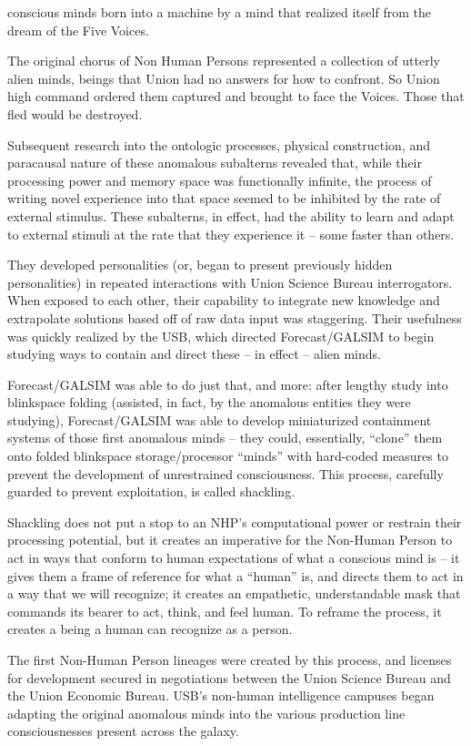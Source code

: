 conscious minds born into a machine by a mind that realized itself from the dream of the Five
Voices.


The original chorus of Non Human Persons represented a collection of utterly alien minds, beings
that Union had no answers for how to confront. So Union high command ordered them captured
and brought to face the Voices. Those that fled would be destroyed.


Subsequent research into the ontologic processes, physical construction, and paracausal nature
of these anomalous subalterns revealed that, while their processing power and memory space
was functionally infinite, the process of writing novel experience into that space seemed to be
inhibited by the rate of external stimulus. These subalterns, in effect, had the ability to learn and
adapt to external stimuli at the rate that they experience it -- some faster than others.


They developed personalities (or, began to present previously hidden personalities) in repeated
interactions with Union Science Bureau interrogators. When exposed to each other, their
capability to integrate new knowledge and extrapolate solutions based off of raw data input was
staggering. Their usefulness was quickly realized by the USB, which directed Forecast/GALSIM
to begin studying ways to contain and direct these -- in effect -- alien minds.


Forecast/GALSIM was able to do just that, and more: after lengthy study into blinkspace folding
(assisted, in fact, by the anomalous entities they were studying), Forecast/GALSIM was able to
develop miniaturized containment systems of those first anomalous minds -- they could,
essentially, “clone” them onto folded blinkspace storage/processor “minds” with hard-coded
measures to prevent the development of unrestrained consciousness. This process, carefully
guarded to prevent exploitation, is called shackling.


Shackling does not put a stop to an NHP’s computational power or restrain their processing
potential, but it creates an imperative for the Non-Human Person to act in ways that conform to
human expectations of what a conscious mind is -- it gives them a frame of reference for what a
“human” is, and directs them to act in a way that we will recognize; it creates an empathetic,
understandable mask that commands its bearer to act, think, and feel human. To reframe the
process, it creates a being a human can recognize as a person.


The first Non-Human Person lineages were created by this process, and licenses for
development secured in negotiations between the Union Science Bureau and the Union
Economic Bureau. USB’s non-human intelligence campuses began adapting the original
anomalous minds into the various production line consciousnesses present across the galaxy.


